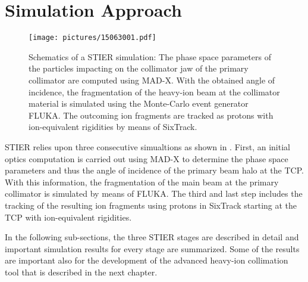 \section{Simulation Approach}
%
  \begin{figure}[h]
  \centering
  \texttt{[image: pictures/15063001.pdf]}
  \caption{Schematics of a STIER simulation: The phase space parameters of the particles impacting on the collimator jaw of the primary collimator are computed using MAD-X. With the obtained angle of incidence, the fragmentation of the heavy-ion beam at the collimator material is simulated using the Monte-Carlo event generator FLUKA. The outcoming ion fragments are tracked as protons with ion-equivalent rigidities by means of SixTrack.}  
  \label{pic:15062601}
  \end{figure}
%
STIER relies upon three consecutive simualtions as shown in . First, an initial optics computation is carried out using MAD-X to determine the phase space parameters and thus the angle of incidence of the primary beam halo at the TCP. With this information, the fragmentation of the main beam at the primary collimator is simulated by means of FLUKA. The third and last step includes the tracking of the resulting ion fragments using protons in SixTrack starting at the TCP with ion-equivalent rigidities. 

In the following sub-sections, the three STIER stages are described in detail and important simulation results for every stage are summarized. Some of the results are important also for the development of the advanced heavy-ion collimation tool that is described in the next chapter.
%
%
